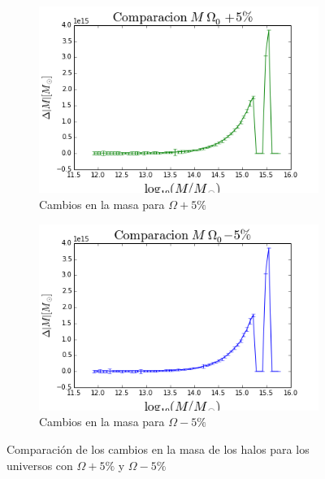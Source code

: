 \begin{figure}[h]
	\centering
	\begin{subfigure}[b]{0.49\textwidth}
		\includegraphics[width=\textwidth]{Trabajo/logm-deltam-mas}
		\caption{Cambios en la masa para $\Omega+5\%$}
		\label{fig:logmdeltammas}
	\end{subfigure}
	\begin{subfigure}[b]{0.49\textwidth}
		\includegraphics[width=\textwidth]{Trabajo/logm-deltam-menos}
		\caption{Cambios en la masa para $\Omega-5\%$}
		\label{fig:logmdeltammenos}
	\end{subfigure}
	\caption{Comparación de los cambios en la masa de los halos para los universos con $\Omega+5\%$ y $\Omega-5\%$}
	\label{fig:logmdeltam}
\end{figure}

